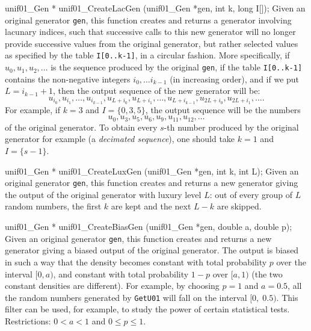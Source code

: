 unif01_Gen * unif01_CreateLacGen (unif01_Gen *gen, int k, long I[]);
\endcode
 \tab
  Given an original generator {\tt gen}, this function 
%
  creates and returns a generator involving lacunary indices, such that
  successive calls to this new generator
  will no longer provide successive values from the original
  generator, but rather selected values as specified by
  the table {\tt I[0..k-1]}, in a circular fashion.
  More specifically, if $u_0, u_1, u_2, \dots$ is the sequence
  produced by the original {\tt gen}, if the table {\tt I[0..k-1]}
  contains the non-negative integers $i_0, \dots i_{k-1}$ (in increasing
  order), and if we put $L = i_{k-1}+1$,
  then the output sequence of the new generator will be:
   $$ u_{i_0}, u_{i_1}, \dots, u_{i_{k-1}}, u_{L+i_0}, u_{L+i_1},
      \dots, u_{L+i_{k-1}}, u_{2L+i_0}, u_{2L+i_1}, \dots. $$
  For example, if  $k=3$ and $I = \{0, 3, 5\}$,
  the output sequence will be the numbers
   $$ u_{0}, u_{3}, u_{5}, u_{6}, u_{9}, u_{11}, u_{12}, \dots $$
  of the original generator.
  To obtain every $s$-th number produced by the original generator
  for example (a {\em decimated sequence\/}), one should take
  $k=1$ and $I = \{s-1\}$.
 \endtab
\code


unif01_Gen * unif01_CreateLuxGen (unif01_Gen *gen, int k, int L);
\endcode
 \tab   Given an original generator {\tt gen}, this function
% 
  creates and returns a new generator giving the output of the
  original generator with luxury level $L$: out of every group of $L$
  random numbers, the first $k$ are kept and the next $L-k$ are skipped.
 \endtab
\code


unif01_Gen * unif01_CreateBiasGen (unif01_Gen *gen, double a, double p);
\endcode
 \tab  Given an original generator {\tt gen}, this function 
  creates and returns a new generator giving a biased output of the
  original generator.  The output is biased 
%
  in such a way that the density becomes
  constant with total probability $p$ over the interval $[0, a)$, and
  constant with total probability $1 - p$ over $[a, 1)$ (the two constant
  densities are different). For example, by choosing $p= 1$ and $a = 0.5$,
  all the random numbers generated by {\tt GetU01} will fall
  on the interval $[0,\; 0.5)$. This filter can be used, for example,
  to study the power of certain statistical tests.
  Restrictions: $0 < a < 1$ and $0 \le p \le 1$.
 \endtab
\code


